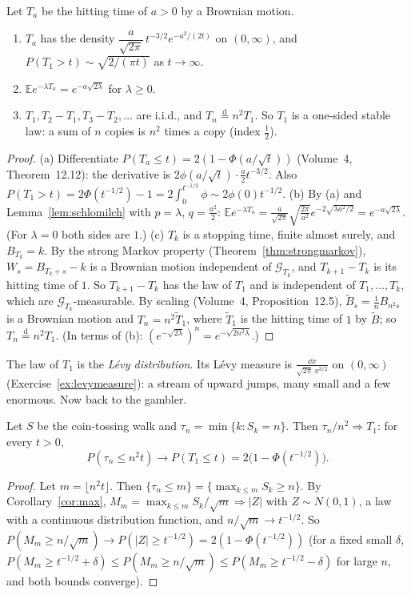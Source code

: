 \begin{theorem}\label{thm:hitting}
Let $T_a$ be the hitting time of $a>0$ by a Brownian motion.
\begin{enumerate}[label=(\alph*)]
\item $T_a$ has the density $\dfrac a{\sqrt{2\pi}}\,t^{-3/2}e^{-a^2/(2t)}$ on $(0,\infty)$, and $P(T_1>t)\sim\sqrt{2/(\pi t)}$ as $t\to\infty$.
\item $\mathbb Ee^{-\lambda T_a}=e^{-a\sqrt{2\lambda}}$ for $\lambda\ge0$.
\item $T_1,T_2-T_1,T_3-T_2,\dots$ are i.i.d., and $T_n\overset{\mathrm d}=n^2T_1$. So $T_1$ is a one-sided stable law: a sum of $n$ copies is $n^2$ times a copy (index $\frac12$).
\end{enumerate}
\end{theorem}
\begin{proof}
(a) Differentiate $P(T_a\le t)=2(1-\Phi(a/\sqrt t))$ (Volume~4, Theorem~12.12): the derivative is $2\phi(a/\sqrt t)\cdot\frac a2t^{-3/2}$. Also
$P(T_1>t)=2\Phi(t^{-1/2})-1=2\int_0^{t^{-1/2}}\phi\sim2\phi(0)t^{-1/2}$.
(b) By (a) and Lemma~\ref{lem:schlomilch} with $p=\lambda$, $q=\frac{a^2}2$: $\mathbb Ee^{-\lambda T_a}=\frac a{\sqrt{2\pi}}\sqrt{\frac{2\pi}{a^2}}e^{-2\sqrt{\lambda a^2/2}}=e^{-a\sqrt{2\lambda}}$.
(For $\lambda=0$ both sides are $1$.)
(c) $T_k$ is a stopping time, finite almost surely, and $B_{T_k}=k$. By the strong Markov property (Theorem~\ref{thm:strongmarkov}), $W_s=B_{T_k+s}-k$ is a Brownian
motion independent of $\mathcal G_{T_k}$, and $T_{k+1}-T_k$ is its hitting time of $1$. So $T_{k+1}-T_k$ has the law of $T_1$ and is independent of
$T_1,\dots,T_k$, which are $\mathcal G_{T_k}$-measurable. By scaling (Volume~4, Proposition~12.5), $\tilde B_s=\frac1nB_{n^2s}$ is a Brownian motion and
$T_n=n^2\tilde T_1$, where $\tilde T_1$ is the hitting time of $1$ by $\tilde B$; so $T_n\overset{\mathrm d}=n^2T_1$. (In terms of (b): $(e^{-\sqrt{2\lambda}})^n=e^{-\sqrt{2n^2\lambda}}$.)
\end{proof}

The law of $T_1$ is the \emph{L\'evy distribution}. Its L\'evy measure is $\frac{\dd x}{\sqrt{2\pi}\,x^{3/2}}$ on $(0,\infty)$ (Exercise~\ref{ex:levymeasure}): a stream of
upward jumps, many small and a few enormous. Now back to the gambler.

\begin{theorem}\label{thm:gambler}
Let $S$ be the coin-tossing walk and $\tau_n=\min\{k:S_k=n\}$. Then $\tau_n/n^2\Rightarrow T_1$: for every $t>0$,
\[
P(\tau_n\le n^2t)\to P(T_1\le t)=2\bigl(1-\Phi(t^{-1/2})\bigr).
\]
\end{theorem}
\begin{proof}
Let $m=\lfloor n^2t\rfloor$. Then $\{\tau_n\le m\}=\{\max_{k\le m}S_k\ge n\}$. By Corollary~\ref{cor:max}, $M_m=\max_{k\le m}S_k/\sqrt m\Rightarrow|Z|$ with $Z\sim N(0,1)$,
a law with a continuous distribution function, and $n/\sqrt m\to t^{-1/2}$. So $P(M_m\ge n/\sqrt m)\to P(|Z|\ge t^{-1/2})=2(1-\Phi(t^{-1/2}))$ (for a fixed small
$\delta$, $P(M_m\ge t^{-1/2}+\delta)\le P(M_m\ge n/\sqrt m)\le P(M_m\ge t^{-1/2}-\delta)$ for large $n$, and both bounds converge).
\end{proof}


